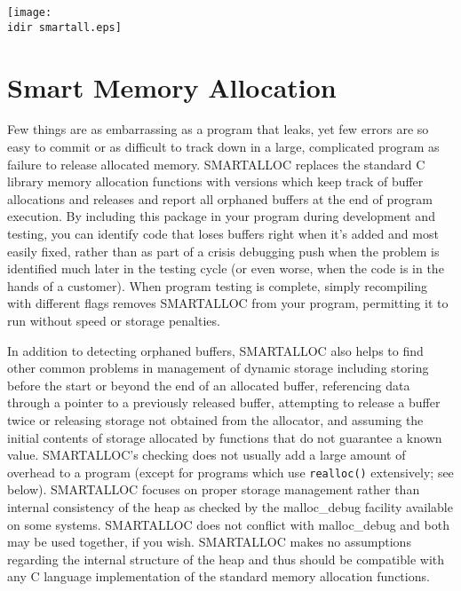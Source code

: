 
\texttt{[image: \\idir smartall.eps]}

\chapter{Smart Memory Allocation}
\label{_ChapterStart4}

Few things are as embarrassing as a program that leaks, yet few errors are so
easy to commit or as difficult to track down in a large, complicated program
as failure to release allocated memory. SMARTALLOC replaces the standard C
library memory allocation functions with versions which keep track of buffer
allocations and releases and report all orphaned buffers at the end of program
execution. By including this package in your program during development and
testing, you can identify code that loses buffers right when it's added and
most easily fixed, rather than as part of a crisis debugging push when the
problem is identified much later in the testing cycle (or even worse, when the
code is in the hands of a customer). When program testing is complete, simply
recompiling with different flags removes SMARTALLOC from your program,
permitting it to run without speed or storage penalties.

In addition to detecting orphaned buffers, SMARTALLOC also helps to find other
common problems in management of dynamic storage including storing before the
start or beyond the end of an allocated buffer, referencing data through a
pointer to a previously released buffer, attempting to release a buffer twice
or releasing storage not obtained from the allocator, and assuming the initial
contents of storage allocated by functions that do not guarantee a known
value. SMARTALLOC's checking does not usually add a large amount of overhead
to a program (except for programs which use {\tt realloc()} extensively; see
below). SMARTALLOC focuses on proper storage management rather than internal
consistency of the heap as checked by the malloc\_debug facility available on
some systems. SMARTALLOC does not conflict with malloc\_debug and both may be
used together, if you wish. SMARTALLOC makes no assumptions regarding the
internal structure of the heap and thus should be compatible with any C
language implementation of the standard memory allocation functions.

